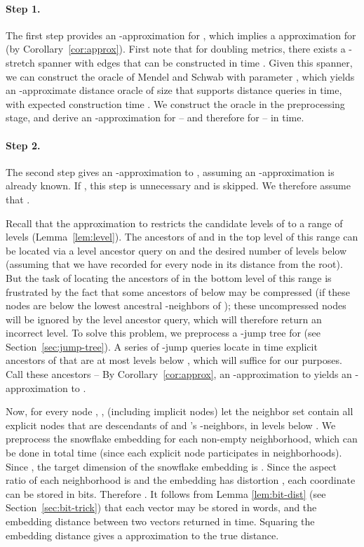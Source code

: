 \documentclass[11pt]{article}
\begin{document}
\paragraph{Step 1.}
The first step provides an -approximation for , which implies a 
approximation for  (by Corollary~\ref{cor:approx}). First note that for
doubling metrics, there exists a -stretch spanner with  edges that can
be constructed in time  \cite{GaoGuiNgu04, GoRo08b}. Given this
spanner, we can construct the oracle of Mendel and Schwab \cite[Theorem 2(2)]{MeSc09} with
parameter , which yields an -approximate distance oracle of size
 that supports distance queries in  time, with expected construction time
. We construct the oracle in the preprocessing stage, and derive
an -approximation for  -- and therefore for  -- in  time.

\paragraph{Step 2.} 
The second step gives an -approximation to , assuming an -approximation is already known. If , this step is unnecessary and is 
skipped. We therefore assume that .

Recall that the  approximation to  restricts the candidate levels of
 to a range of  levels (Lemma~\ref{lem:level}). The ancestors of
 and  in the top level of this range can be located via a level ancestor query on 
and the desired number of levels below  (assuming that we have recorded for every
node in  its distance from the root). But the task of locating the ancestors of  in
the bottom level of this range is frustrated by the fact that some ancestors of  below 
 may be
compressed (if these nodes are below the lowest ancestral -neighbors of ); these
uncompressed nodes will be ignored by the level ancestor query, which will therefore return an
incorrect level. To solve this problem, we preprocess a -jump tree for  (see
Section~\ref{sec:jump-tree}). A series of -jump queries locate in  time
explicit ancestors of  that are at most  levels below , which will
suffice for our purposes. Call these ancestors  -- By Corollary~\ref{cor:approx}, an
-approximation to  yields an -approximation to 
.

Now, for every node , , (including implicit nodes) let
the neighbor set  contain all explicit nodes that are descendants of  and 's
-neighbors, in  levels below . We preprocess the snowflake embedding
for each non-empty neighborhood, which can be done in total time  (since each explicit node participates in  
neighborhoods). Since , the target dimension of the
snowflake embedding is . Since the aspect ratio of each
neighborhood is  and the embedding has distortion ,
each coordinate can be stored in  bits.
Therefore . It follows from Lemma \ref{lem:bit-dist} (see 
Section~\ref{sec:bit-trick}) that each vector
may be stored in  words, and the embedding distance between two vectors returned in
 time. Squaring the embedding distance gives a  approximation to the true
distance.
\end{document}
